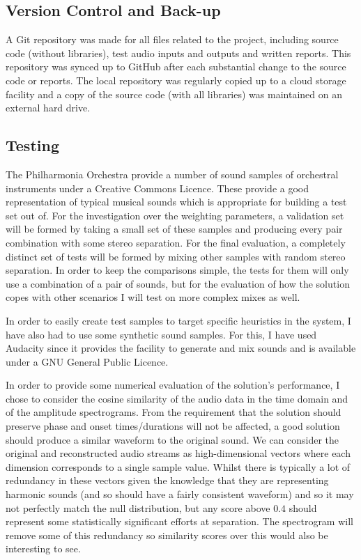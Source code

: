 \documentclass[10pt,twoside,a4paper]{report}
\begin{document}
\subsection{Version Control and Back-up}

A Git repository was made for all files related to the project, including source code (without libraries), test audio inputs and outputs and written reports. This repository was synced up to GitHub after each substantial change to the source code or reports. The local repository was regularly copied up to a cloud storage facility and a copy of the source code (with all libraries) was maintained on an external hard drive.

\subsection{Testing}

The Philharmonia Orchestra provide a number of sound samples \cite{philharmonia} of orchestral instruments under a Creative Commons Licence. These provide a good representation of typical musical sounds which is appropriate for building a test set out of. For the investigation over the weighting parameters, a validation set will be formed by taking a small set of these samples and producing every pair combination with some stereo separation. For the final evaluation, a completely distinct set of tests will be formed by mixing other samples with random stereo separation. In order to keep the comparisons simple, the tests for them will only use a combination of a pair of sounds, but for the evaluation of how the solution copes with other scenarios I will test on more complex mixes as well.

In order to easily create test samples to target specific heuristics in the system, I have also had to use some synthetic sound samples. For this, I have used Audacity \cite{audacity} since it provides the facility to generate and mix sounds and is available under a GNU General Public Licence.

In order to provide some numerical evaluation of the solution's performance, I chose to consider the cosine similarity of the audio data in the time domain and of the amplitude spectrograms. From the requirement that the solution should preserve phase and onset times/durations will not be affected, a good solution should produce a similar waveform to the original sound. We can consider the original and reconstructed audio streams as high-dimensional vectors where each dimension corresponds to a single sample value. Whilst there is typically a lot of redundancy in these vectors given the knowledge that they are representing harmonic sounds (and so should have a fairly consistent waveform) and so it may not perfectly match the null distribution, but any score above $ 0.4 $ should represent some statistically significant efforts at separation. The spectrogram will remove some of this redundancy so similarity scores over this would also be interesting to see.
\end{document}
